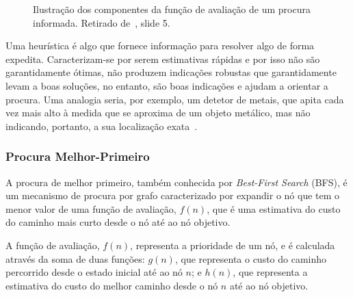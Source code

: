 \begin{figure}[H]
    \begin{center}
    \end{center}
    \caption{Ilustração dos componentes da função de avaliação de um procura informada. Retirado de~\cite{isel:iasa:slides:proc-espaco-estados-parte-3}, slide 5.}
    \label{fig:proc-informada}
\end{figure}

Uma heurística é algo que fornece informação para resolver algo de forma expedita.
Caracterizam-se por serem estimativas rápidas e por isso não são garantidamente ótimas, não produzem indicações robustas que garantidamente levam a boas soluções, no entanto, são boas indicações e ajudam a orientar a procura.
Uma analogia seria, por exemplo, um detetor de metais, que apita cada vez mais alto à medida que se aproxima de um objeto metálico, mas não indicando, portanto, a sua localização exata~\cite{ist:leic:resumos:procura-informada}.

\subsubsection{Procura Melhor-Primeiro}\label{subsubsec:procura-melhor-primeiro}

A procura de melhor primeiro, também conhecida por \textit{Best-First Search} (BFS), é um mecanismo de procura por grafo caracterizado por expandir o nó que tem o menor valor de uma função de avaliação, $f(n)$, que é uma estimativa do custo do caminho mais curto desde o nó até ao nó objetivo.

A função de avaliação, $f(n)$, representa a prioridade de um nó, e é calculada através da soma de duas funções: $g(n)$, que representa o custo do caminho percorrido desde o estado inicial até ao nó $n$; e $h(n)$, que representa a estimativa do custo do melhor caminho desde o nó $n$ até ao nó objetivo.

